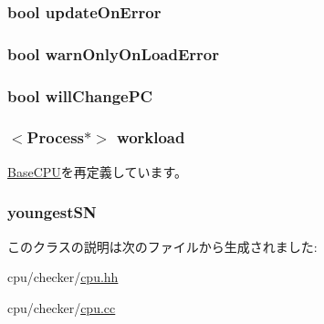 \label{classCheckerCPU_ae44d4afdef854be5de937985e00e162c}
\hypertarget{classCheckerCPU_a5c4b1a378d5b47717f50008b307ed1fb}{
\subsubsection[{updateOnError}]{\setlength{\rightskip}{0pt plus 5cm}bool {\bf updateOnError}}}
\label{classCheckerCPU_a5c4b1a378d5b47717f50008b307ed1fb}
\hypertarget{classCheckerCPU_af590e28bcadd292986518887f8ba3498}{
\subsubsection[{warnOnlyOnLoadError}]{\setlength{\rightskip}{0pt plus 5cm}bool {\bf warnOnlyOnLoadError}}}
\label{classCheckerCPU_af590e28bcadd292986518887f8ba3498}
\hypertarget{classCheckerCPU_a4f3f7f9c8e8331d34afcddc9d9cf1db7}{
\subsubsection[{willChangePC}]{\setlength{\rightskip}{0pt plus 5cm}bool {\bf willChangePC}}}
\label{classCheckerCPU_a4f3f7f9c8e8331d34afcddc9d9cf1db7}
\hypertarget{classCheckerCPU_a9b2cb3a230c37a5bb09eca1375e1a5bf}{
\subsubsection[{workload}]{$<${\bf Process}$\ast$$>$ {\bf workload}}}
\label{classCheckerCPU_a9b2cb3a230c37a5bb09eca1375e1a5bf}


\hyperlink{classBaseCPU_a73d872f4e6fdf59531004dac33e2cd93}{BaseCPU}を再定義しています。\hypertarget{classCheckerCPU_a258f3535e74a3e37e7c1afe9611266d2}{
\subsubsection[{youngestSN}]{ {\bf youngestSN}}}
\label{classCheckerCPU_a258f3535e74a3e37e7c1afe9611266d2}


このクラスの説明は次のファイルから生成されました:\begin{DoxyCompactItemize}
\item 
cpu/checker/\hyperlink{checker_2cpu_8hh}{cpu.hh}\item 
cpu/checker/\hyperlink{checker_2cpu_8cc}{cpu.cc}\end{DoxyCompactItemize}
